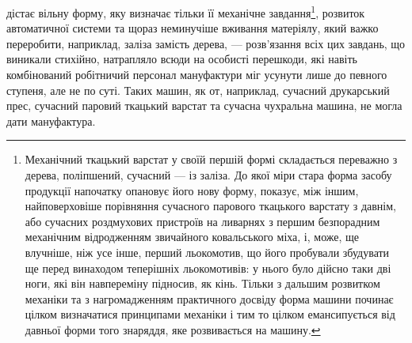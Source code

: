 дістає вільну форму, яку визначає тільки її механічне завдання\footnote{
Механічний ткацький варстат у своїй першій формі складається
переважно з дерева, поліпшений, сучасний — із заліза. До якої міри стара
форма засобу продукції напочатку опановує його нову форму, показує,
між іншим, найповерховіше порівняння сучасного парового ткацького
варстату з давнім, або сучасних роздмухових пристроїв на ливарнях
з першим безпорадним механічним відродженням звичайного ковальського
міха, і, може, ще влучніше, ніж усе інше, перший льокомотив, що його
пробували збудувати ще перед винаходом теперішніх льокомотивів: у
нього було дійсно таки дві ноги, які він навпереміну підносив, як кінь.
Тільки з дальшим розвитком механіки та з нагромадженням практичного
досвіду форма машини починає цілком визначатися принципами механіки
і тим то цілком емансипується від давньої форми того знаряддя, яке розвивається
на машину.
},
розвиток автоматичної системи та щораз неминучіше вживання
матеріялу, який важко переробити, наприклад, заліза замість
дерева, — розв’язання всіх цих завдань, що виникали стихійно,
натрапляло всюди на особисті перешкоди, які навіть комбінований
робітничий персонал мануфактури міг усунути лише
до певного ступеня, але не по суті. Таких машин, як от, наприклад,
сучасний друкарський прес, сучасний паровий ткацький
варстат та сучасна чухральна машина, не могла дати
мануфактура.

